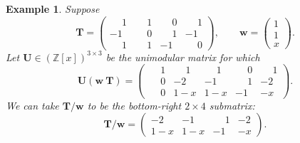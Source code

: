 \documentclass[a4paper, 11pt]{article}
\newcommand{\Z}{\mathbb{Z}}
\newcommand{\bw}{\bm{w}}
\newcommand{\bT}{\bm{T}}
\newcommand{\bU}{\bm{U}}
\newcommand{\indet}{x}
\newcommand{\polyring}{\Z[\indet]}
\newtheorem{example}{Example}
\begin{document}
\begin{example}
Suppose
\[
\bT=\left(\begin{array}{cccc}
\phantom{-}1 & \phantom{-}1 & \phantom{-}0 & \phantom{-}1\\
-1 & \phantom{-}0 & \phantom{-}1 & -1\\
\phantom{-}1 & \phantom{-}1 & -1 & \phantom{-}0
\end{array}\right),\qquad\bw=\left(\begin{array}{c}
1\\
1\\
x
\end{array}\right).
\]
Let $\bU\in(\polyring)^{3\times 3}$ be the unimodular matrix for which
\[
\bU\left(\bw\ \bT\right)=\left(\begin{array}{ccccc}
\phantom{-}1 & \phantom{-}1 & \phantom{-}1 & \phantom{-}0 & \phantom{-}1\\
\phantom{-}0 & -2 & -1 & \phantom{-}1 & -2\\
\phantom{-}0 & 1-x & 1-x & -1 & -x
\end{array}\right).
\]
We can take $\bT/\bw$ to be the bottom-right $2\times 4$ submatrix:
\[
\bT/\bw=\left(\begin{array}{cccc}
-2 & -1 & \phantom{-}1 & -2\\
1-x & 1-x & -1 & -x
\end{array}\right).
\]
\end{example}
\end{document}
